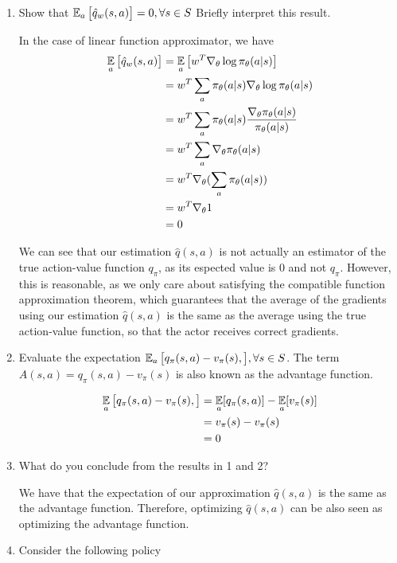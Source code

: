 \documentclass{exam}
\begin{document}
\begin{enumerate}
    \item Show that $\operatorname*{\mathbb{E}}_a \big[ \hat{q}_w(s, a) \big] = 0, \forall s \in S$ Briefly interpret this result.
            \begin{solutionorlines}[2in]
                In the case of linear function approximator, we have
                \begin{align*}
                \operatorname*{\mathbb{E}}_a \big[ \hat{q}_w(s, a) \big] &= \operatorname*{\mathbb{E}}_a \big[ w^T \nabla_{\theta} \log \pi_{\theta} (a | s) \big] \\
                &=  w^T \sum_a \pi_{\theta}(a | s) \nabla_{\theta} \log \pi_{\theta} (a | s) \\
                &= w^T \sum_a \pi_{\theta}(a | s) \frac{\nabla_{\theta} \pi_{\theta} (a | s)}{\pi_{\theta} (a | s)} \\
                &= w^T \sum_a \nabla_{\theta} \pi_{\theta} (a | s) \\
                &= w^T \nabla_{\theta} ( \sum_a   \pi_{\theta} (a | s) ) \\
                &= w^T \nabla_{\theta} 1 \\
                &= 0
                \end{align*}
                
                We can see that our estimation $\hat{q}(s, a)$ is not actually an estimator of the true action-value function $q_\pi$, as its espected value is 0 and not $q_\pi$. However, this is reasonable, as we only care about satisfying the compatible function approximation theorem, which guarantees that the average of the gradients using our estimation $\hat{q}(s, a)$ is the same as the average using the true action-value function, so that the actor receives correct gradients.
            \end{solutionorlines}
    \item Evaluate the expectation $\operatorname*{\mathbb{E}}_a \big[ q_{\pi} (s, a) - v_{\pi} (s),  \big], \forall s \in S$. The term $A(s, a) = q_{\pi} (s, a) - v_{\pi} (s) $ is also known as the advantage function.
            \begin{solutionorlines}[2in]
            \begin{align*}
                \operatorname*{\mathbb{E}}_a \big[ q_{\pi} (s, a) - v_{\pi} (s),  \big] &= \operatorname*{\mathbb{E}}_a [q_{\pi} (s, a)] - \operatorname*{\mathbb{E}}_a [v_{\pi} (s)] \\
                    &= v_{\pi} (s) - v_{\pi} (s) \\
                    &= 0
            \end{align*}
            \end{solutionorlines}
    \item What do you conclude from the results in 1 and 2?
            \begin{solutionorlines}[2in]
                We have that the expectation of our approximation $\hat{q}(s, a)$ is the same as the advantage function. Therefore, optimizing $\hat{q}(s, a)$ can be also seen as optimizing the advantage function.
            \end{solutionorlines}
    \item Consider the following policy
    

\end{enumerate}
\end{document}
